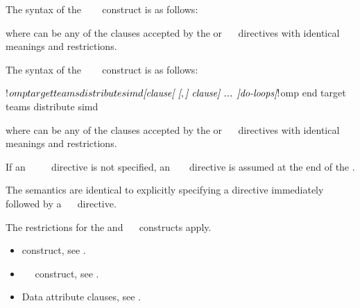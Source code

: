 \syntax
\begin{ccppspecific}
The syntax of the ~~~ 
construct is as follows:

\begin{ompcPragma}
#pragma omp target teams distribute simd \plc{\}
            \plc{[clause[ [},\plc{] clause] ...  ] new-line}
   \plc{for-loops}
\end{ompcPragma}

where  can be any of the clauses accepted by the  or
~~ directives with identical meanings 
and restrictions.
\end{ccppspecific}

\begin{fortranspecific}
The syntax of the ~~~ 
construct is as follows:

\begin{ompfPragma}
!$omp target teams distribute simd \plc{[clause[ [},\plc{] clause] ... ]}
    \plc{do-loops}
\plc{[}!$omp end target teams distribute simd\plc{]}
\end{ompfPragma}

where  can be any of the clauses accepted by the  or
~~ directives with identical meanings 
and restrictions.

If an ~~~~ 
directive is not specified, an ~  
~ directive is assumed at the end of the .
\end{fortranspecific}

\descr
The semantics are identical to explicitly specifying a  directive 
immediately followed by a ~~ directive.

\restrictions
The restrictions for the  and ~~ 
constructs apply.

\crossreferences
\begin{itemize}
\item {} construct, see
.

\item {}~~ construct, see
.

\item Data attribute clauses, see
.
\end{itemize}



